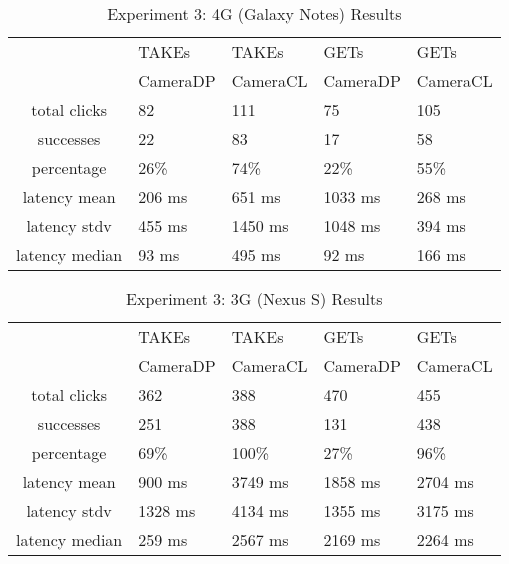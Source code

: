 \begin{table}[htb]
\begin{scriptsize} 
\caption{Experiment 3: 4G (Galaxy Notes) Results} 
\label{table:exp-3-4g-results}
 \begin{center}
 \begin{tabular}{| c | p{1.5cm} | p{1.5cm} | p{1.5cm} | p{1.4cm} |}
  \hline
  & TAKEs & TAKEs & GETs & GETs \\
  & CameraDP & CameraCL & CameraDP & CameraCL \\
  \hline
  total clicks & 82 & 111 & 75 & 105 \\
  \hline
  successes & 22 & 83 & 17 & 58 \\
  \hline
  percentage & 26\% & 74\% & 22\% & 55\% \\
  \hline
  latency mean & 206 ms & 651 ms & 1033 ms & 268 ms \\
  \hline
  latency stdv & 455 ms &1450 ms &1048 ms & 394 ms \\
  \hline
  latency median & 93 ms & 495 ms & 92 ms & 166 ms \\
  \hline
  \end{tabular}
  \end{center}
\end{scriptsize}
\end{table}

\begin{table}[htb]
\begin{scriptsize} 
\caption{Experiment 3: 3G (Nexus S) Results} 
\label{table:exp-3-3g-results}
 \begin{center}
 \begin{tabular}{| c | p{1.5cm} | p{1.5cm} | p{1.5cm} | p{1.4cm} |}
  \hline
  & TAKEs & TAKEs & GETs & GETs \\
  & CameraDP & CameraCL & CameraDP & CameraCL \\
  \hline
  total clicks & 362 & 388 & 470 & 455 \\
  \hline
  successes & 251 & 388 & 131 & 438 \\
  \hline
  percentage & 69\% & 100\% & 27\% & 96\% \\
  \hline
  latency mean & 900 ms & 3749 ms & 1858 ms & 2704 ms \\
  \hline
  latency stdv & 1328 ms & 4134 ms &1355 ms & 3175 ms \\
  \hline
  latency median & 259 ms & 2567 ms & 2169 ms & 2264 ms \\
  \hline
  \end{tabular}
  \end{center}
\end{scriptsize}
\end{table}

